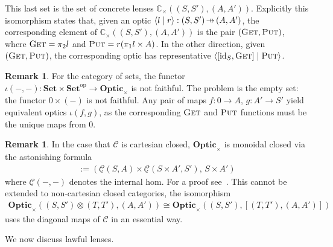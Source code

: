 \documentclass[11pt,a4paper]{article}
\theoremstyle{plain}
\theoremstyle{definition}
\newtheorem{remark}[theorem]{Remark}
\newcommand{\C}{\mathscr{C}}
\newcommand{\homC}{\underline{\C}}
\newcommand{\Set}{\mathbf{Set}}
\newcommand{\Optic}{\mathbf{Optic}}
\newcommand{\conc}{\mathbb{C}}
\newcommand{\id}{\mathrm{id}}
\newcommand{\op}{\mathrm{op}}
\newcommand{\rep}[2]{{\ensuremath \left\langle #1 \mid #2 \right\rangle}}
\newcommand{\fget}{\textsc{Get}}
\newcommand{\fput}{\textsc{Put}}
\newcommand{\hto}{\ensuremath{\,\mathaccent\shortmid\rightarrow\,}}
\begin{document}
This last set is the set of concrete lenses $\conc_\times((S, S'), (A, A'))$. Explicitly this isomorphism states that, given an optic $\rep{l}{r } : (S, S') \hto (A, A')$, the corresponding element of $\conc_\times((S, S'), (A, A'))$ is the pair $(\fget, \fput)$, where $\fget = \pi_2 l$ and $\fput = r (\pi_1 l \times A)$. In the other direction, given $(\fget, \fput)$, the corresponding optic has representative $\rep{[\id_S, \fget]}{\fput}$.

\begin{remark}\label{lens-iota-not-faithful}
  For the category of sets, the functor $\iota(-, -) : \Set \times \Set^\op \to \Optic_\times$ is not faithful. The problem is the empty set: the functor $0 \times (-)$ is not faithful. Any pair of maps $f : 0 \to A$, $g : A' \to S'$ yield equivalent optics $\iota(f, g)$, as the corresponding $\fget$ and $\fput$ functions must be the unique maps from $0$.
\end{remark}

\begin{remark}
  In the case that $\C$ is cartesian closed, $\Optic_\times$ is monoidal closed via the astonishing formula
  \begin{align*}
    [(S, S'), (A, A')] := (\homC(S, A) \times \homC(S \times A', S'), \, S \times A')
  \end{align*}
  where $\homC(-, -)$ denotes the internal hom. For a proof see~\cite[Section 1.2]{DialecticaCategories}. This cannot be extended to non-cartesian closed categories, the isomorphism
  \begin{align*}
    \Optic_\times((S, S') \otimes (T, T'), (A, A')) \cong \Optic_\times((S, S'),  [(T, T'), (A, A')])
  \end{align*}
  uses the diagonal maps of $\C$ in an essential way.
\end{remark}

We now discuss lawful lenses.
\end{document}

